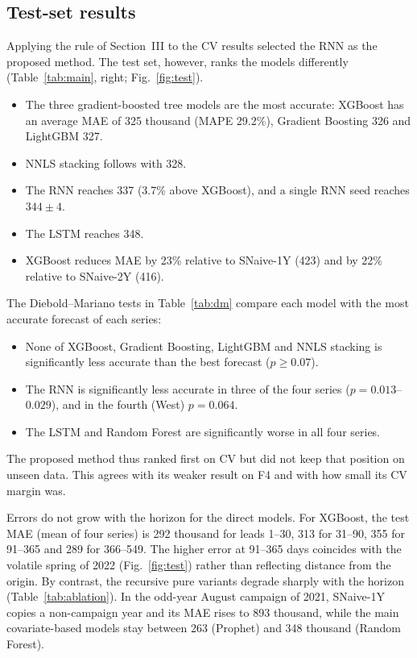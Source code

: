 \documentclass[conference]{IEEEtran}
\begin{document}
\subsection{Test-set results}
Applying the rule of Section~III to the CV results selected the RNN as the proposed method.
The test set, however, ranks the models differently (Table~\ref{tab:main}, right; Fig.~\ref{fig:test}).
\begin{itemize}
\item The three gradient-boosted tree models are the most accurate: XGBoost has an average MAE of 325 thousand (MAPE 29.2\%), Gradient Boosting 326 and LightGBM 327.
\item NNLS stacking follows with 328.
\item The RNN reaches 337 (3.7\% above XGBoost), and a single RNN seed reaches $344\pm4$.
\item The LSTM reaches 348.
\item XGBoost reduces MAE by 23\% relative to SNaive-1Y (423) and by 22\% relative to SNaive-2Y (416).
\end{itemize}
The Diebold--Mariano tests in Table~\ref{tab:dm} compare each model with the most accurate forecast of each series:
\begin{itemize}
\item None of XGBoost, Gradient Boosting, LightGBM and NNLS stacking is significantly less accurate than the best forecast ($p\ge0.07$).
\item The RNN is significantly less accurate in three of the four series ($p=0.013$--$0.029$), and in the fourth (West) $p=0.064$.
\item The LSTM and Random Forest are significantly worse in all four series.
\end{itemize}
The proposed method thus ranked first on CV but did not keep that position on unseen data.
This agrees with its weaker result on F4 and with how small its CV margin was.

Errors do not grow with the horizon for the direct models.
For XGBoost, the test MAE (mean of four series) is 292 thousand for leads 1--30, 313 for 31--90, 355 for 91--365 and 289 for 366--549.
The higher error at 91--365 days coincides with the volatile spring of 2022 (Fig.~\ref{fig:test}) rather than reflecting distance from the origin.
By contrast, the recursive pure variants degrade sharply with the horizon (Table~\ref{tab:ablation}).
In the odd-year August campaign of 2021, SNaive-1Y copies a non-campaign year and its MAE rises to 893 thousand, while the main covariate-based models stay between 263 (Prophet) and 348 thousand (Random Forest).
\end{document}
